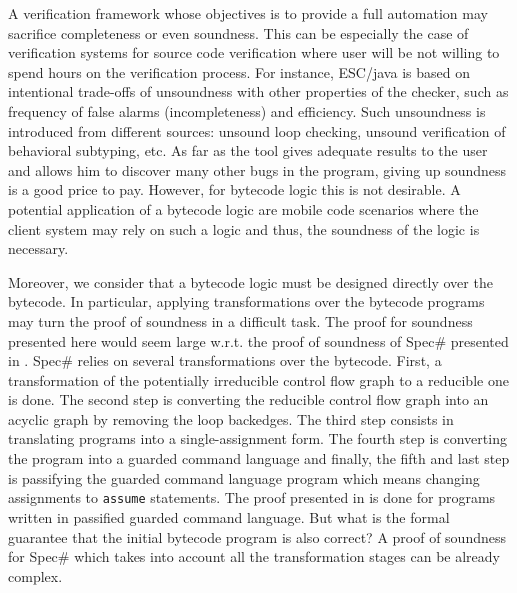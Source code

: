 A verification framework whose objectives is to provide a full automation may sacrifice completeness or even soundness.
This can be especially the case of verification systems for source code verification where user 
will be not willing to spend hours on the verification process. For instance, ESC/java
 \cite{escjava} is based on intentional trade-offs of unsoundness with other properties of the checker, 
such as frequency of false alarms (incompleteness) and efficiency. Such unsoundness is introduced from different sources: unsound loop checking, unsound
verification of behavioral subtyping, etc.  As far as the tool gives adequate results to the user and allows him 
to discover  many other bugs in the program, giving up soundness  is a good price to pay. 
However, for bytecode logic this is not desirable. A potential application of  a bytecode logic are mobile code scenarios
where the client system may rely on such a logic and thus, the soundness of the logic is necessary. 

Moreover, we consider that a bytecode logic must be designed directly over the  bytecode. 
In particular, applying transformations over the bytecode programs may turn 
the proof of soundness in a difficult task.  
 The proof for soundness presented here would seem large w.r.t. 
the proof of soundness of Spec\# presented in  \cite{leinoWPUP}. Spec\# relies on several transformations over the 
bytecode. First, a transformation of the potentially irreducible control flow graph to a reducible one is done.
The second step  is converting the reducible control flow graph into an acyclic graph by removing the loop backedges.
 The third step consists in translating programs into a single-assignment form.
The fourth step is converting the program into a  guarded command language and finally, the fifth and last 
step is passifying the guarded command language program which means changing assignments
to \texttt{assume} statements. The proof presented in  
\cite{leinoWPUP} is done for  programs written in passified guarded command language.
But what is the formal guarantee that the initial  bytecode program is also correct? 
A proof of soundness for Spec\# which takes into account all the transformation stages can be 
already complex. 
